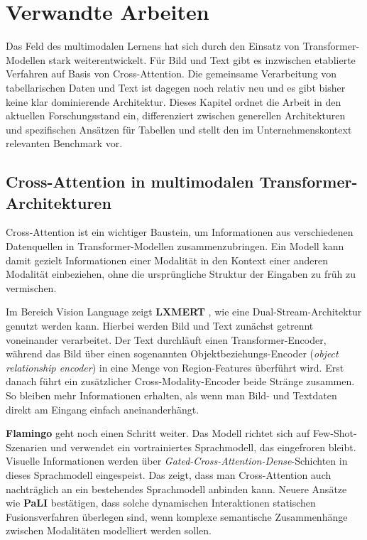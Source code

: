 \section{Verwandte Arbeiten}
\label{sec:related_work}

Das Feld des multimodalen Lernens hat sich durch den Einsatz von Transformer-Modellen stark weiterentwickelt. Für Bild und Text gibt es inzwischen etablierte Verfahren auf Basis von Cross-Attention. Die gemeinsame Verarbeitung von tabellarischen Daten und Text ist dagegen noch relativ neu und es gibt bisher keine klar dominierende Architektur. Dieses Kapitel ordnet die Arbeit in den aktuellen Forschungsstand ein, differenziert zwischen generellen Architekturen und spezifischen Ansätzen für Tabellen und stellt den im Unternehmenskontext relevanten Benchmark vor.

\subsection{Cross-Attention in multimodalen Transformer-Architekturen}
Cross-Attention ist ein wichtiger Baustein, um Informationen aus verschiedenen Datenquellen in Transformer-Modellen zusammenzubringen. Ein Modell kann damit gezielt Informationen einer Modalität in den Kontext einer anderen Modalität einbeziehen, ohne die ursprüngliche Struktur der Eingaben zu früh zu vermischen.

Im Bereich Vision Language zeigt \textbf{LXMERT} \cite{Tan2019}, wie eine Dual-Stream-Architektur genutzt werden kann. Hierbei werden Bild und Text zunächst getrennt voneinander verarbeitet. Der Text durchläuft einen Transformer-Encoder, während das Bild über einen sogenannten Objektbeziehungs-Encoder (\textit{object relationship encoder}) in eine Menge von Region-Features überführt wird. Erst danach führt ein zusätzlicher Cross-Modality-Encoder beide Stränge zusammen. So bleiben mehr Informationen erhalten, als wenn man Bild- und Textdaten direkt am Eingang einfach aneinanderhängt.

\textbf{Flamingo} \cite{Alayrac2022} geht noch einen Schritt weiter. Das Modell richtet sich auf Few-Shot-Szenarien und verwendet ein vortrainiertes Sprachmodell, das eingefroren bleibt. Visuelle Informationen werden über \textit{Gated-Cross-Attention-Dense}-Schichten in dieses Sprachmodell eingespeist. Das zeigt, dass man Cross-Attention auch nachträglich an ein bestehendes Sprachmodell anbinden kann. Neuere Ansätze wie \textbf{PaLI} \cite{Chen2023} bestätigen, dass solche dynamischen Interaktionen statischen Fusionsverfahren überlegen sind, wenn komplexe semantische Zusammenhänge zwischen Modalitäten modelliert werden sollen.

